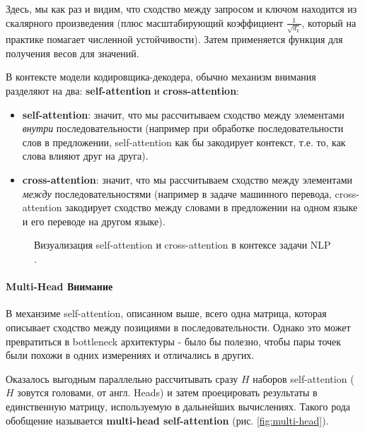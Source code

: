 Здесь, мы как раз и видим, что сходство между запросом и ключом находится из 
скалярного произведения (плюс масштабирующий коэффициент $\frac{1}{\sqrt{d_k}}$, 
который на практике помагает численной устойчивости). Затем применяется функция 
 для получения весов для значений.

В контексте модели кодировщика-декодера, обычно механизм внимания разделяют на 
два: \textbf{self-attention} и \textbf{cross-attention}:
\begin{itemize}
    \item \textbf{self-attention}: значит, что мы рассчитываем сходство между элементами 
    \textit{внутри} последовательности (например при обработке последовательности 
    слов в предложении, self-attention как бы закодирует контекст, т.е. то, как 
    слова влияют друг на друга).
    \item \textbf{cross-attention}: значит, что мы рассчитываем сходство между 
    элементами \textit{между} последовательностями (например в задаче машинного перевода, 
    cross-attention закодирует сходство между словами в предложении на одном языке и 
    его переводе на другом языке).
\end{itemize}

\begin{figure}[h!]
    \centering
    \caption{Визуализация self-attention и cross-attention в контексе задачи NLP \cite{3blue1brown_attention}.}
    \label{fig:selfXcross_attention}
\end{figure}

\paragraph{Multi-Head Внимание}

В механзиме self-attention, описанном выше, всего одна матрица, которая 
описывает сходство между позициями в последовательности. Однако это 
может превратиться в bottleneck архитектуры - было бы полезно, 
чтобы пары точек были похожи в одних измерениях и отличались в других. 

Оказалось выгодным параллельно рассчитывать сразу $H$ наборов self-attention 
($H$ зовутся головами, от англ. Heads) и затем проецировать результаты 
в единственную матрицу, используемую в дальнейших вычислениях. Такого рода 
обобщение называется \textbf{multi-head self-attention} \cite{turner_transformers_intro}
(рис. \ref{fig:multi-head}).

